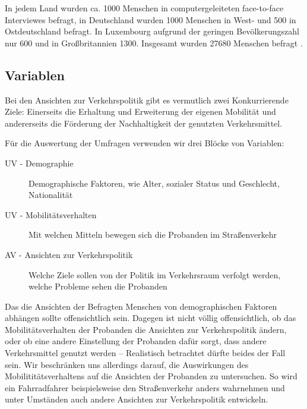 In jedem Land wurden ca. 1000 Menschen in computergeleiteten face-to-face Interviewes befragt, in Deutschland wurden 1000 Menschen in West- und 500 in Ostdeutschland befragt. In Luxembourg aufgrund der geringen Bevölkerungszahl nur 600 und in Großbritannien 1300. Insgesamt wurden 27680 Menschen befragt \parencite{eceuropaeu}.

\subsection{Variablen}

Bei den Ansichten zur Verkehrspolitik gibt es vermutlich zwei Konkurrierende Ziele: Einerseits die Erhaltung und Erweiterung der eigenen Mobilität und andererseits die Förderung der Nachhaltigkeit der genutzten Verkehrsmittel.

Für die Auswertung der Umfragen verwenden wir drei Blöcke von Variablen:
\begin{description}
	\item[UV - Demographie] Demographische Faktoren, wie Alter, sozialer Status und Geschlecht, Nationalität
	\item[UV - Mobilitätsverhalten] Mit welchen Mitteln bewegen sich die Probanden im Straßenverkehr
	\item[AV - Ansichten zur Verkehrspolitik] Welche Ziele sollen von der Politik im Verkehrsraum verfolgt werden, welche Probleme sehen die Probanden
\end{description}
Das die Ansichten der Befragten Menschen von demographischen Faktoren abhängen sollte offensichtlich sein.
Dagegen ist nicht völlig offensichtlich, ob das Mobilitätsverhalten der Probanden die Ansichten zur Verkehrspolitik ändern, oder ob eine andere Einstellung der Probanden dafür sorgt, dass andere Verkehrsmittel genutzt werden – Realistisch betrachtet dürfte beides der Fall sein.
Wir beschränken uns allerdings darauf, die Auswirkungen des Mobilititätsverhaltens auf die Ansichten der Probanden zu untersuchen.
So wird ein Fahrradfahrer beispielsweise den Straßenverkehr anders wahrnehmen und unter Umständen auch andere Ansichten zur Verkehrspolitik entwickeln.
\nocite{schulz}
